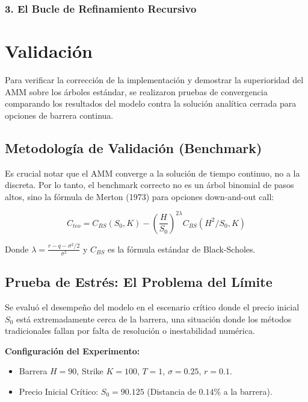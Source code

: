 \subsubsection{3. El Bucle de Refinamiento Recursivo} 

\section{Validación} 
\label{sec:validacion_arboles}

Para verificar la corrección de la implementación y demostrar la superioridad del AMM sobre los árboles estándar, se realizaron pruebas de convergencia comparando los resultados del modelo contra la solución analítica cerrada para opciones de barrera continua.

\subsection{Metodología de Validación (Benchmark)} 

Es crucial notar que el AMM converge a la solución de tiempo continuo, no a la discreta. Por lo tanto, el benchmark correcto no es un árbol binomial de pasos altos, sino la fórmula de Merton (1973) para opciones down-and-out call:

\begin{equation} 
  C_{teo} = C_{BS}(S_0, K) - \left( \frac{H}{S_0} \right)^{2\lambda} C_{BS}(H^2/S_0, K) \label{eq:merton_benchmark} 
\end{equation} 

Donde $\lambda=\frac {r-q-\sigma^2/2} {\sigma^2}$ y $C_{BS}$ es la fórmula estándar de Black-Scholes.

\subsection{Prueba de Estrés: El Problema del Límite} 

Se evaluó el desempeño del modelo en el escenario crítico donde el precio inicial $S_0$ está extremadamente cerca de la barrera, una situación donde los métodos tradicionales fallan por falta de resolución o inestabilidad numérica.

\textbf{Configuración del Experimento:} 

\begin{itemize} 
  \item Barrera $H=90$, Strike $K=100$, $T=1$, $\sigma=0.25$, $r=0.1$. 
  
  \item Precio Inicial Crítico: $S_0=90.125$ (Distancia de $0.14\%$ a la barrera). 
\end{itemize}

